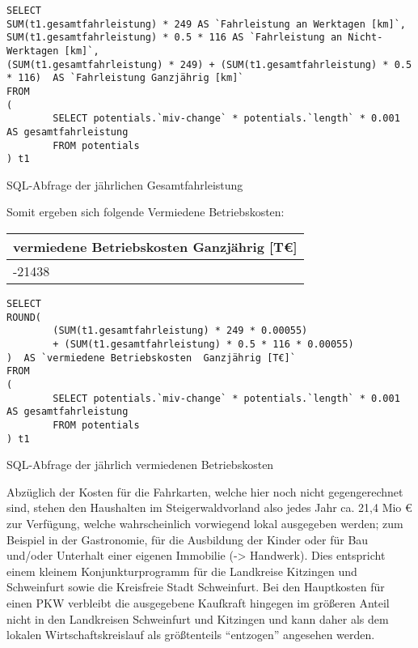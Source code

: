 \documentclass[fontsize=12pt,a4paper]{scrreprt}
\begin{document}
\newline
\newline
\begin{listing}[htbp]
\begin{verbatim}
SELECT
SUM(t1.gesamtfahrleistung) * 249 AS `Fahrleistung an Werktagen [km]`, 
SUM(t1.gesamtfahrleistung) * 0.5 * 116 AS `Fahrleistung an Nicht-Werktagen [km]`, 
(SUM(t1.gesamtfahrleistung) * 249) + (SUM(t1.gesamtfahrleistung) * 0.5 * 116)  AS `Fahrleistung Ganzjährig [km]`
FROM
(
        SELECT potentials.`miv-change` * potentials.`length` * 0.001 AS gesamtfahrleistung
        FROM potentials
) t1
\end{verbatim}
\caption{SQL-Abfrage der jährlichen Gesamtfahrleistung}\label{lst-gesamtfahrleistung-jaehrlich}
\end{listing}

Somit ergeben sich folgende Vermiedene Betriebskosten:
\newline
\newline
\begin{tabular}{ | l |}
        \hline
        vermiedene Betriebskosten  Ganzjährig [T€]\\ 
        \hline
        -21438\\
        \hline
\end{tabular}

\begin{listing}[htbp]
\begin{verbatim}
SELECT 
ROUND(
        (SUM(t1.gesamtfahrleistung) * 249 * 0.00055) 
        + (SUM(t1.gesamtfahrleistung) * 0.5 * 116 * 0.00055)
)  AS `vermiedene Betriebskosten  Ganzjährig [T€]`
FROM
(
        SELECT potentials.`miv-change` * potentials.`length` * 0.001 AS gesamtfahrleistung
        FROM potentials
) t1
\end{verbatim}
\caption{SQL-Abfrage der jährlich vermiedenen Betriebskosten}\label{lst-betriebskosten-jaehrlich}
\end{listing}

Abzüglich der Kosten für die Fahrkarten, welche hier noch nicht gegengerechnet sind, stehen den Haushalten im Steigerwaldvorland also jedes Jahr ca. 21,4 Mio € zur Verfügung, welche wahrscheinlich vorwiegend lokal ausgegeben werden; zum Beispiel in der Gastronomie, für die Ausbildung der Kinder oder für Bau und/oder Unterhalt einer eigenen Immobilie (-> Handwerk). Dies entspricht einem kleinem Konjunkturprogramm für die Landkreise Kitzingen und Schweinfurt sowie die Kreisfreie Stadt Schweinfurt. Bei den Hauptkosten für einen PKW verbleibt die ausgegebene Kaufkraft hingegen im größeren Anteil nicht in den Landkreisen Schweinfurt und Kitzingen und kann daher als dem lokalen Wirtschaftskreislauf als größtenteils \enquote{entzogen} angesehen werden.
\end{document}
